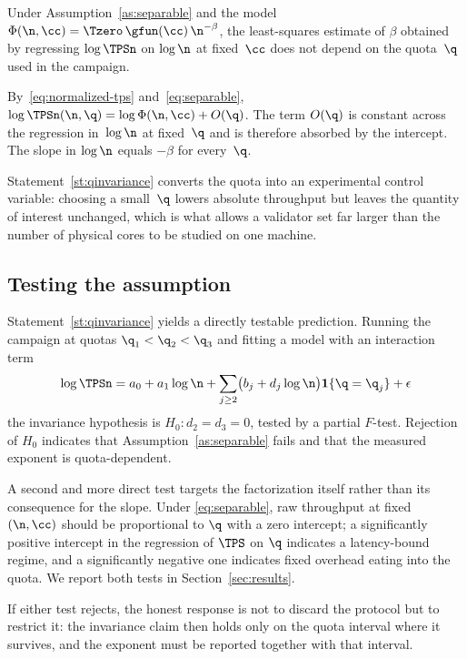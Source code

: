 \begin{State}
\label{st:qinvariance}
Under Assumption~\ref{as:separable} and the model
$\Phi(\n,\cc)=\Tzero\,\gfun(\cc)\,\n^{-\beta}$, the least-squares estimate of
$\beta$ obtained by regressing $\log\TPSn$ on $\log\n$ at fixed~$\cc$ does not
depend on the quota~$\q$ used in the campaign.
\end{State}

\begin{Proof}
By~\eqref{eq:normalized-tps} and~\eqref{eq:separable},
$\log\TPSn(\n,\q)=\log\Phi(\n,\cc)+O(\q)$. The term $O(\q)$ is constant across
the regression in~$\log\n$ at fixed~$\q$ and is therefore absorbed by the
intercept. The slope in $\log\n$ equals $-\beta$ for every~$\q$.
\end{Proof}

\begin{Remark}
Statement~\ref{st:qinvariance} converts the quota into an experimental control
variable: choosing a small~$\q$ lowers absolute throughput but leaves the
quantity of interest unchanged, which is what allows a validator set far larger
than the number of physical cores to be studied on one machine.
\end{Remark}

\subsection{Testing the assumption}

Statement~\ref{st:qinvariance} yields a directly testable prediction. Running
the campaign at quotas $\q_{1}<\q_{2}<\q_{3}$ and fitting a model with an
interaction term
\begin{equation}
\log\TPSn = a_{0}+a_{1}\log\n+\sum_{j\ge2}\bigl(b_{j}+d_{j}\log\n\bigr)
\mathbf{1}\{\q=\q_{j}\}+\epsilon
\label{eq:ancova}
\end{equation}
the invariance hypothesis is $H_{0}: d_{2}=d_{3}=0$, tested by a partial
$F$-test. Rejection of $H_{0}$ indicates that
Assumption~\ref{as:separable} fails and that the measured exponent is
quota-dependent.

A second and more direct test targets the factorization itself rather than its
consequence for the slope. Under \eqref{eq:separable}, raw throughput at fixed
$(\n,\cc)$ should be proportional to $\q$ with a zero intercept; a significantly
positive intercept in the regression of $\TPS$ on $\q$ indicates a
latency-bound regime, and a significantly negative one indicates fixed overhead
eating into the quota. We report both tests in Section~\ref{sec:results}.

If either test rejects, the honest response is not to discard the protocol but
to restrict it: the invariance claim then holds only on the quota interval where
it survives, and the exponent must be reported together with that interval.
